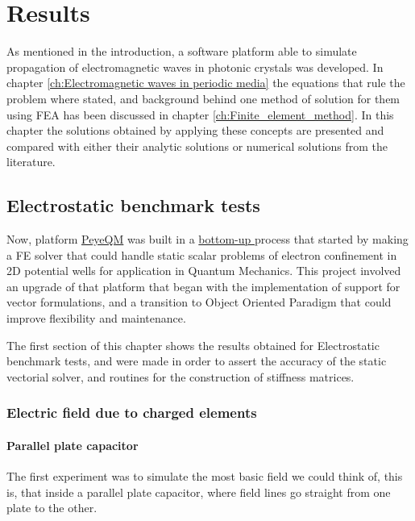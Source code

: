 \chapter{Results}
\label{ch:Results}
As mentioned in the introduction, a software platform able to simulate propagation of electromagnetic waves in photonic crystals was developed. In chapter \ref{ch:Electromagnetic waves in periodic media} the equations that rule the problem where stated, and background behind one method of solution for them using FEA has been discussed in chapter \ref{ch:Finite_element_method}. In this chapter the solutions obtained by applying these concepts are presented and compared with either their analytic solutions or numerical solutions from the literature.

\section{Electrostatic benchmark tests}

Now, platform \href{https://github.com/bebopsan/peyeQM}{PeyeQM} was built in a \href{en.wikipedia.org/wiki/Top-down_and_bottom-up_design}{bottom-up } process that started by making a FE solver that could handle static scalar problems of electron confinement in 2D potential wells for application in Quantum Mechanics. This project involved an upgrade of that platform that began with the implementation of support for vector formulations, and a transition to Object Oriented Paradigm that could improve flexibility and maintenance.

The first section of this chapter shows the results obtained for Electrostatic benchmark tests, and were made in order to assert the accuracy of the static vectorial solver, and  routines for the construction of stiffness matrices.

\subsection{Electric field due to charged elements}
\subsubsection{Parallel plate capacitor}
The first experiment was to simulate the most basic field we could think of, this is, that inside a parallel plate capacitor, where field lines go straight from one plate to the other. 

